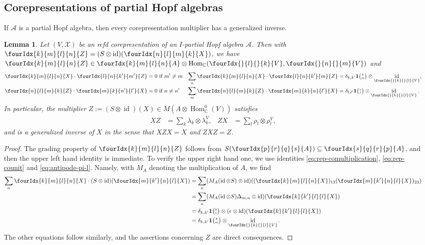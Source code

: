 \documentclass[11pt]{article}
\DeclareMathOperator{\id}{id}
\DeclareMathOperator{\Hom}{Hom}
\newcommand{\C}{\mathbb{C}}
\newcommand{\Grt}[3]{#1{\tiny {\begin{pmatrix} #2\\#3\end{pmatrix}}}}
\newcommand{\UnitC}[2]{\Grt{\mathbf{1}}{#1}{#2}}
\newcommand{\Gr}[5]{\fourIdx{#2}{#4}{#3}{#5}{#1}}%
\newcommand{\Gru}[3]{\Gr{#1}{}{}{#2}{#3}}
\newtheorem{Lem}[Theorem]{Lemma}
\theoremstyle{definition}
\numberwithin{equation}{section}
\begin{document}
\subsection{Corepresentations of partial Hopf algebras}


If $\mathscr{A}$ is a partial Hopf algebra,  then every
corepresentation multiplier has a generalized inverse.
\begin{Lem} \label{lemma:rep-invertible}
  Let $(V,\mathscr{X})$ be an rcfd corepresentation of an $I$-partial Hopf
  algebra $\mathscr{A}$. Then with $\Gr{Z}{k}{l}{m}{n} = (S\otimes \id)(\Gr{X}{n}{m}{l}{k})$, we have $\Gr{Z}{k}{l}{m}{n}\in \Gr{A}{k}{l}{m}{n}\otimes \Hom_{\C}(\Gru{V}{l}{k},\Gru{V}{n}{m})$ and
  \begin{align*}
    \Gr{X}{k}{l}{m}{n}  \cdot \Gr{Z}{l}{k'}{n}{m'} &=0 \text{ if } m'\neq m &
      \sum_{n} \Gr{X}{k}{l}{m}{n} \cdot \Gr{Z}{l}{k'}{n}{m} &= \delta_{k,k'}\UnitC{k}{m} \otimes
      \id_{\Gru{V}{k}{l}}, \\
      \Gr{Z}{n}{m}{l}{k}\cdot \Gr{X}{m}{n'}{k}{l'} &= 0
      \text{ if } n\neq n' & 
      \sum_{m} \Gr{Z}{n}{m}{l}{k}\cdot \Gr{X}{m}{n}{k}{l'} &=
      \delta_{l,l'} \UnitC{n}{l} \otimes \id_{\Gru{V}{k}{l}}.
  \end{align*}
  In particular, the multiplier $Z:=     (S \otimes
  \id)(X) \in M(A \otimes \Hom_{\C}^{0}(V))$
  satisfies
  \begin{align} \label{eq:rep-generalized-inverse}
    XZ &= \sum_{k} \lambda_{k} \otimes \lambda^{V}_{k}, &
    ZX &= \sum_{l} \rho_{l} \otimes \rho^{V}_{l},
  \end{align}
  and is a generalized inverse of $X$ in the sense that $XZX=X$ and $ZXZ=Z$.
\end{Lem}
\begin{proof}
  The grading property of $\Gr{Z}{k}{l}{m}{n}$ follows from  $S(\Gr{A}{p}{q}{r}{s})\subseteq \Gr{A}{s}{r}{q}{p}$, and then the upper left hand identity is immediate.  To
  verify the upper right hand one, we use identities \eqref{eq:rep-comultiplication}, \eqref{eq:rep-counit} and \eqref{eq:antipode-pi-l}. Namely, with $M_{A}$ denoting the multiplication of $A$, we find
  \begin{align*}
      \sum_{n} \Gr{X}{k}{l}{m}{n} \cdot (S \otimes
      \id)(\Gr{X}{m}{n}{k'}{l}) &= \sum_{n} (M_{A}  (\id \otimes S)
      \otimes \id)((\Gr{X}{k}{l}{m}{n})_{13}(\Gr{X}{m}{n}{k'}{l})_{23})
 \\ &= \sum_{n} (M_{A} (\id \otimes S)  \Delta_{m,n} \otimes
      \id)(\Gr{X}{k}{l}{k'}{l}) \\
      &= \delta_{k,k'} \UnitC{k}{l} \otimes (\epsilon \otimes
      \id)(\Gr{X}{k}{l}{k'}{l})
      \\ &=
\delta_{k,k'}\UnitC{k}{m} \otimes
      \id_{\Gru{V}{k}{l}}. \end{align*} The other
equations follow similarly, and the assertions concerning $Z$ are
direct consequences.
\end{proof}
\end{document}
